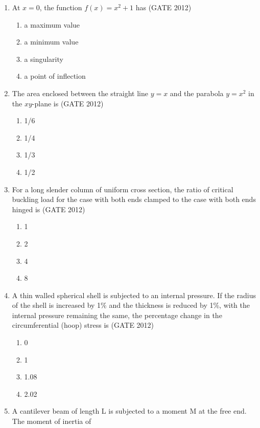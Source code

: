 \documentclass[journal,12pt,onecolumn]{IEEEtran}
\theoremstyle{remark}
\begin{document}
\begin{enumerate}
  \item At $x=0$, the function $f(x) = x^2 + 1$ has
  \hfill{(GATE 2012)}
  \begin{enumerate}
    \item a maximum value
    \item a minimum value
    \item a singularity
    \item a point of inflection
  \end{enumerate}
\vspace{1cm}
  \item The area enclosed between the straight line $y=x$ and the parabola $y=x^2$ in the $xy$-plane is
  \hfill{(GATE 2012)}
  \begin{enumerate}
    \item 1/6
    \item 1/4
    \item 1/3
    \item 1/2
  \end{enumerate}
\vspace{1cm}
  \item For a long slender column of uniform cross section, the ratio of critical buckling load for the case with both ends clamped to the case with both ends hinged is
  \hfill{(GATE 2012)}
  \begin{enumerate}
    \item 1
    \item 2
    \item 4
    \item 8
  \end{enumerate}
\vspace{1cm}
  \item A thin walled spherical shell is subjected to an internal pressure. If the radius of the shell is increased by 1\% and the thickness is reduced by 1\%, with the internal pressure remaining the same, the percentage change in the circumferential (hoop) stress is
  \hfill{(GATE 2012)}
  \begin{enumerate}
    \item 0
    \item 1
    \item 1.08
    \item 2.02
  \end{enumerate}
\vspace{1cm}
  \item A cantilever beam of length L is subjected to a moment M at the free end. The moment of inertia of

\end{enumerate}
\end{document}
